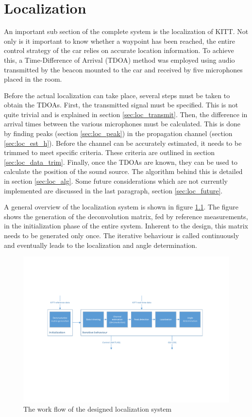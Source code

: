 \documentclass[11pt,titlepage]{report}
\begin{document}
\chapter{Localization}
\label{ch:localization}
An important sub section of the complete system is the localization of KITT. Not only is it important to know whether a waypoint has been reached, the entire control strategy of the car relies on accurate location information. To achieve this, a Time-Difference of Arrival (TDOA) method was employed using audio transmitted by the beacon mounted to the car and received by five microphones placed in the room.

Before the actual localization can take place, several steps must be taken to obtain the TDOAs. First, the transmitted signal must be specified. This is not quite trivial and is explained in section \ref{sec:loc_transmit}. Then, the difference in arrival times between the various microphones must be calculated. This is done by finding peaks (section \ref{sec:loc_peak}) in the propagation channel (section \ref{sec:loc_est_h}). Before the channel can be accurately estimated, it needs to be trimmed to meet specific criteria. These criteria are outlined in section \ref{sec:loc_data_trim}. Finally, once the TDOAs are known, they can be used to calculate the position of the sound source. The algorithm behind this is detailed in section \ref{sec:loc_alg}. Some future considerations which are not currently implemented are discussed in the last paragraph, section \ref{sec:loc_future}.

A general overview of the localization system is shown in figure \ref{fig:localization-overview}. The figure shows the generation of the deconvolution matrix, fed by reference measurements, in the initialization phase of the entire system. Inherent to the design, this matrix needs to be generated only once. The iterative behaviour is called continuously and eventually leads to the localization and angle determination.
\begin{figure}[H]
	\centering
	\includegraphics[width=\linewidth]{resource/localization-overview.pdf}
	\caption{The work flow of the designed localization system}
	\label{fig:localization-overview}
\end{figure}
\end{document}
